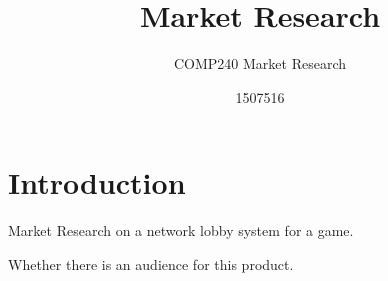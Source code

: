 \documentclass{scrartcl}
\title{Market Research}
\subtitle{COMP240 Market Research}
\author{1507516}
\begin{document}
\maketitle

\section{Introduction}
Market Research on a network lobby system for a game.

Whether there is an audience for this product.
\end{document}
